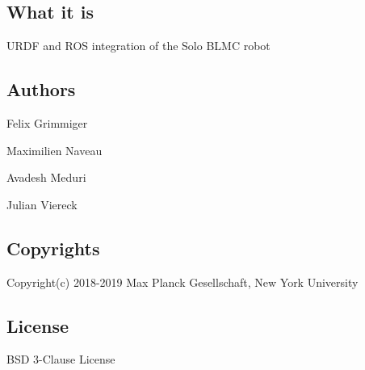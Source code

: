 \subsection*{What it is}

U\+R\+DF and R\+OS integration of the Solo B\+L\+MC robot

\subsection*{Authors}


\begin{DoxyItemize}
\item Felix Grimmiger
\item Maximilien Naveau
\item Avadesh Meduri
\item Julian Viereck
\end{DoxyItemize}

\subsection*{Copyrights}

Copyright(c) 2018-\/2019 Max Planck Gesellschaft, New York University

\subsection*{License}

B\+SD 3-\/\+Clause License 
